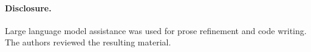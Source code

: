 \documentclass{article}
\begin{document}
\nopagebreak[4]
\paragraph{Disclosure.}
Large language model assistance was used for prose refinement and code writing. The authors
reviewed the resulting material.

\clearpage



\clearpage
\appendix



\end{document}

